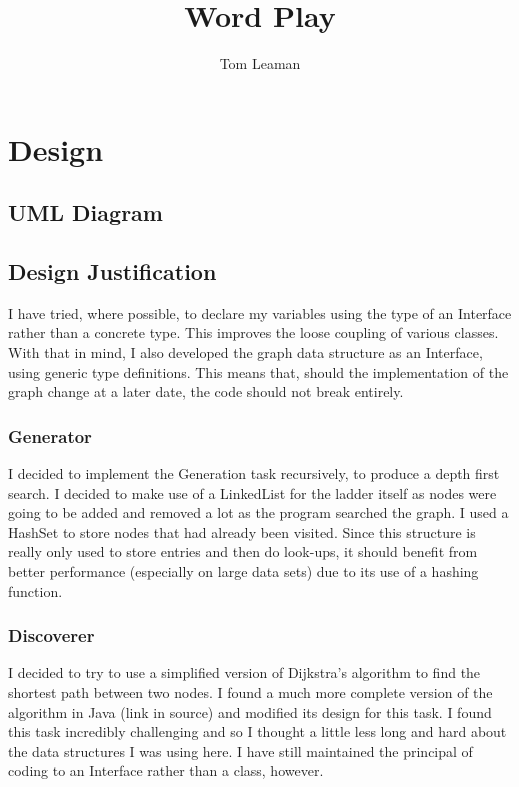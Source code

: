 \documentclass[12pt, titlepage, a4paper, oneside]{article}
\title{Word Play}
\author{Tom Leaman}
\begin{document}
\maketitle

\section*{Design}

\subsection*{UML Diagram}

\newpage
\subsection*{Design Justification}
I have tried, where possible, to declare my variables using the type of an
Interface rather than a concrete type. This improves the loose coupling of
various classes.
With that in mind, I also developed the graph data structure as an Interface,
using generic type definitions. This means that, should the implementation of
the graph change at a later date, the code should not break entirely.

\subsubsection*{Generator}
I decided to implement the Generation task recursively, to produce a depth
first search. I decided to make use of a LinkedList for the ladder itself as
nodes were going to be added and removed a lot as the program searched the graph.
I used a HashSet to store nodes that had already been visited. Since this structure
is really only used to store entries and then do look-ups, it should benefit
from better performance (especially on large data sets) due to its use of
a hashing function.

\subsubsection*{Discoverer}
I decided to try to use a simplified version of Dijkstra's algorithm to find
the shortest path between two nodes. I found a much more complete version of
the algorithm in Java (link in source) and modified its design for this task.
I found this task incredibly challenging and so I thought a little less long
and hard about the data structures I was using here. I have still maintained
the principal of coding to an Interface rather than a class, however.
\end{document}
